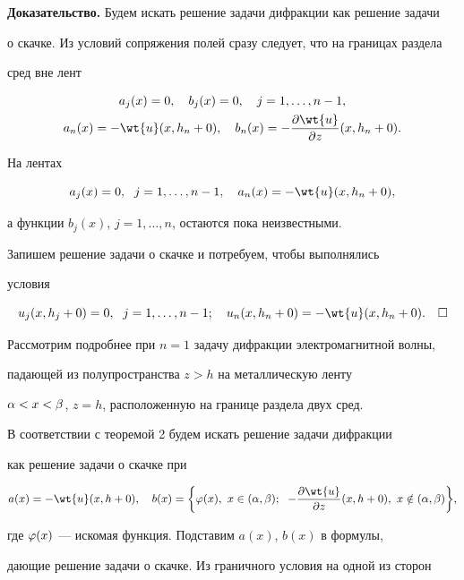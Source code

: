 {\bf Доказательство.} Будем искать решение задачи дифракции как решение задачи


о скачке. Из условий сопряжения полей сразу следует, что на границах раздела


сред вне лент


\begin{gather*}


a_j(x)=0,\quad b_j(x)=0,\quad j=1,\dotsc,n-1 ,\\


a_n(x)=-\wt{u}(x,h_n+0),\quad b_n(x)=-\frac{\pa\wt{u}}{\pa z}(x,h_n+0).


\end{gather*}


На лентах


$$


a_j(x)=0,\ \; j=1,\dotsc,n-1,\quad a_n(x)=-\wt{u}(x,h_n+0),


$$


а функции $b_j(x)$, $j=1,\dotsc,n$, остаются пока неизвестными.


Запишем решение задачи о скачке и потребуем, чтобы выполнялись


условия


$$


u_j(x,h_j+0)=0,\ \; j=1,\dotsc,n-1;\quad


u_n(x,h_n+0)=-\wt{u}(x,h_n+0).\quad\square


$$





Рассмотрим подробнее при $n=1$ задачу дифракции электромагнитной волны,


падающей из полупространства $z>h$ на металлическую ленту


$\alpha<x<\beta$, $z=h$, расположенную на границе раздела двух сред.


В соответствии с теоремой 2 будем искать решение задачи дифракции


как решение задачи о скачке при


$$


a(x)=-\wt{u}(x,h+0),\quad


b(x)= \bigg\{ \fy(x),\ x\in(\al,\be); \ \;


-\frac{\pa\wt{u}}{\pa z}(x,h+0),\ x\notin (\al,\be) \bigg\} ,


$$


где $\varphi(x)$ --- искомая функция. Подставим $a(x)$, $b(x)$ в формулы,


дающие решение задачи о скачке. Из граничного условия на одной из сторон


